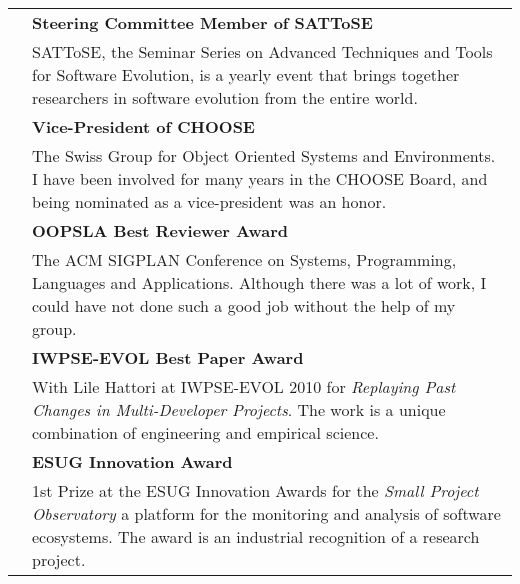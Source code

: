 
\newcommand {\award}[3]{\makebox[2cm][r]{\small #3} & {\bf #1} \\ & #2 \vspace{0.7em}\\}

\begin{tabular}{rp{10.5cm}}

	\award 
		{Steering Committee Member of SATToSE}
		{SATToSE, the Seminar Series on Advanced Techniques and Tools for Software Evolution, is a yearly event that brings together researchers in software evolution from the entire world.}
		{2016 -- } 

	\award 
		{Vice-President of CHOOSE}
		{The Swiss Group for Object Oriented Systems and Environments. I have been involved for many years in the CHOOSE Board, and being nominated as a vice-president was an honor.}
		{2014 -- 2015}

	\award
		{OOPSLA Best Reviewer Award}
		{The ACM SIGPLAN Conference on Systems, Programming, Languages and Applications. Although there was a lot of work, I could have not done such a good job without the help of my group.}
		{2013}

	\award
		{IWPSE-EVOL Best Paper Award}
		{With Lile Hattori at IWPSE-EVOL 2010 for {\em Replaying Past Changes in Multi-Developer Projects}. The work is a unique combination of engineering and empirical science.}
		{2010}

	\award
		{ESUG Innovation Award}
		{1st Prize at the ESUG Innovation Awards for the {\em Small Project Observatory} a platform for the monitoring and analysis of software ecosystems. The award is an industrial recognition of a research project.}
		{2007}





\end{tabular}




%

